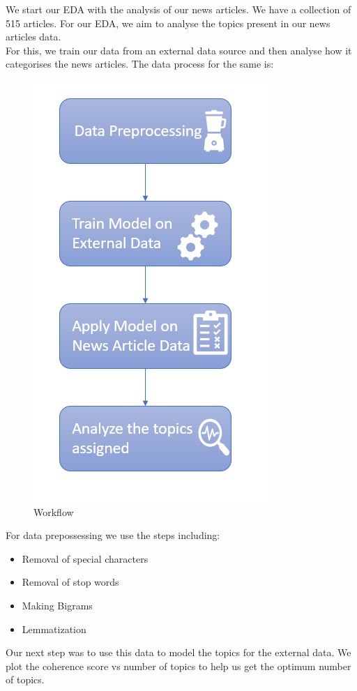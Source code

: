 \documentclass{article}
\begin{document}
We start our EDA with the analysis of our news articles. We have a collection of 515 articles. For our EDA, we aim to analyse the topics present in our news articles data. \\
 For this, we train our data from an external data source and then analyse how it categorises the news articles. The data process for the same is: \\

\begin{figure}[H]
\centering
\includegraphics[scale=0.6]{lda_eda_process.PNG}
\caption{Workflow}
\end{figure}

For data prepossessing we use the steps including:
\begin{itemize}
	\item Removal of special characters
	\item Removal of stop words
    \item Making Bigrams 
    \item Lemmatization
\end{itemize}
Our next step was to use this data to model the topics for the external data. We plot the coherence score vs number of topics to help us get the optimum number of topics.
\end{document}
